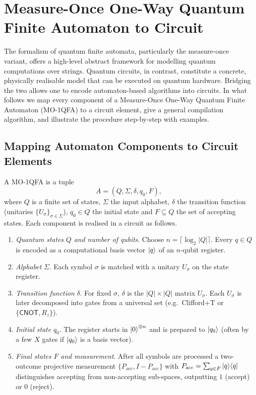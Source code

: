 \section{Measure-Once One-Way Quantum Finite Automaton to Circuit}
\label{sec:moqfa-to-circuit}

The formalism of quantum finite automata, particularly the measure-once variant,
offers a high-level abstract framework for modelling quantum computations over
strings.
Quantum circuits, in contrast, constitute a concrete, physically realisable model
that can be executed on quantum hardware.
Bridging the two allows one to encode automaton-based algorithms into circuits.
In what follows we map every component of a
Measure-Once One-Way Quantum Finite Automaton (MO-1QFA)
to a circuit element, give a general compilation
algorithm, and illustrate the procedure step-by-step with examples.

\subsection{Mapping Automaton Components to Circuit Elements}

A MO-1QFA is a tuple
\[
  A = (Q,\Sigma,\delta,q_0,F),
\]
where $Q$ is a finite set of states, $\Sigma$ the input alphabet,
$\delta$ the transition function (unitaries $\{U_\sigma\}_{\sigma\in\Sigma}$),
$q_0\in Q$ the initial state and $F\subseteq Q$ the set of accepting states.
Each component is realised in a circuit as follows.

\begin{enumerate}[leftmargin=*,label=\textbf{\arabic*.}]
\item \emph{Quantum states $Q$ and number of qubits}.  
      Choose $n=\lceil\log_2|Q|\rceil$.
      Every $q\in Q$ is encoded as a computational basis vector
      $\ket{q}$ of an $n$-qubit register.

\item \emph{Alphabet $\Sigma$}.  
      Each symbol $\sigma$ is matched with a unitary $U_\sigma$ on the
      state register.

\item \emph{Transition function $\delta$}.  
      For fixed $\sigma$, $\delta$ is the $|Q|\times|Q|$ matrix $U_\sigma$.
      Each $U_\sigma$ is later decomposed into gates from a universal
      set (e.g.\ Clifford+T or $\{\textsf{CNOT},R_z\}$).

\item \emph{Initial state $q_0$}.  
      The register starts in $\ket{0}^{\otimes n}$ and is prepared
      to $\ket{q_0}$ (often by a few $X$ gates if $\ket{q_0}$ is a basis
      vector).

\item \emph{Final states $F$ and measurement}.  
      After all symbols are processed a two-outcome
      projective measurement
      $\{P_{\text{acc}},I-P_{\text{acc}}\}$ with
      \(
        P_{\text{acc}}=\sum_{q\in F}\ket{q}\!\bra{q}
      \)
      distinguishes accepting from non-accepting sub-spaces,
      outputting $1$ (accept) or $0$ (reject).
\end{enumerate}

